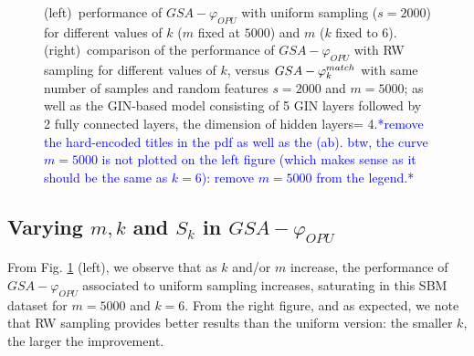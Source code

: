 \documentclass{article}
\newcommand\nt[1]{\textcolor{blue}{#1}}
\begin{document}


\begin{figure}
	\captionsetup[subfigure]{justification=centering}
	\centering
	\caption{(left)~performance of $GSA-\varphi_{OPU}$ with uniform sampling ($s=2000$) for different values of $k$ ($m$ fixed at $5000$) and $m$ ($k$ fixed to $6$). (right)~comparison of the performance of $GSA-\varphi_{OPU}$ with RW sampling for different values of $k$, versus $GSA-\varphi^{match}_k$ with same number of samples and random features $s=2000$ and $m=5000$; as well as the GIN-based model consisting of 5 GIN layers followed by 2 fully connected layers, the dimension of hidden layers= 4.\nt{*remove the hard-encoded titles in the pdf as well as the (ab). btw, the curve $m=5000$ is not plotted on the left figure (which makes sense as it should be the same as $k=6$): remove $m=5000$ from the legend.*}
	}
	\label{fig:GCN}
\end{figure}

\subsection{Varying $m, k$ and $S_k$ in $GSA-{\varphi_{OPU}}$}
From Fig. \ref{fig:GCN} (left), we observe that as $k$ and/or $m$ increase, the performance of $GSA-{\varphi_{OPU}}$ associated to uniform sampling increases, saturating in this SBM dataset for $m=5000$ and $k=6$. From the right figure, and as expected, we note that RW sampling provides better results than the uniform version: the smaller $k$, the larger the improvement.
\end{document}
